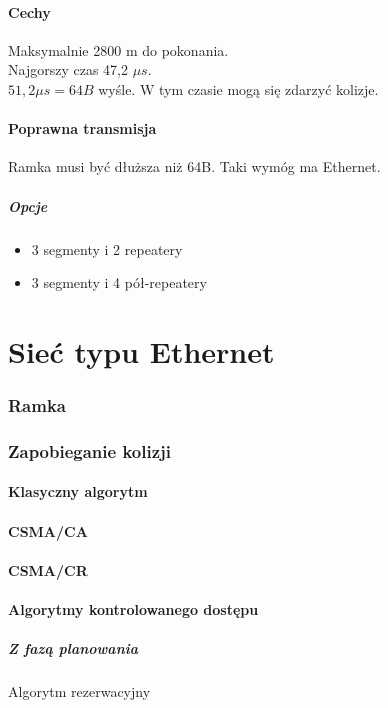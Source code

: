 \documentclass[a4paper,twoside]{article}
\begin{document}
\subsection{Cechy}
Maksymalnie 2800 m do pokonania.\\
Najgorszy czas 47,2 $ \mu s $.\\
$ 51,2 \mu s=64B $ wyśle. W tym czasie mogą się zdarzyć kolizje.
\subsection{Poprawna transmisja}
Ramka musi być dłuższa niż 64B. Taki wymóg ma Ethernet.
\subsubsection{Opcje}
\begin{itemize}
	\item 3 segmenty i 2 repeatery
	\item 3 segmenty i 4 pół-repeatery
\end{itemize}


\part{Sieć typu Ethernet}
\section{Ramka}
\section{Zapobieganie kolizji}
	\subsection{Klasyczny algorytm}
	\subsection{CSMA/CA}
	\subsection{CSMA/CR}
	\subsection{Algorytmy kontrolowanego dostępu}
		\subsubsection{Z fazą planowania}
		Algorytm rezerwacyjny
\end{document}
